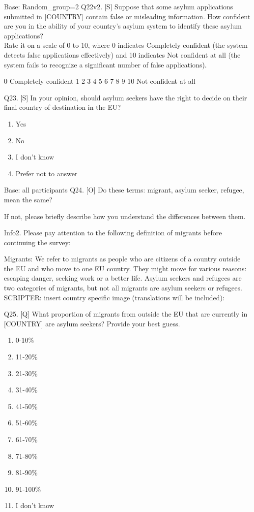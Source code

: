\documentclass[
  12pt,
  a4paper,
]{article}
\providecommand{\tightlist}{%
  \setlength{\itemsep}{0pt}\setlength{\parskip}{0pt}}
\begin{document}
Base: Random\_group=2
Q22v2. {[}S{]} Suppose that some asylum applications submitted in {[}COUNTRY{]} contain false or misleading information. How confident are you in the ability of your country's asylum system to identify these asylum applications?\\
Rate it on a scale of 0 to 10, where 0 indicates Completely confident (the system detects false applications effectively) and 10 indicates Not confident at all (the system fails to recognize a significant number of false applications).

0
Completely confident 1 2 3 4 5 6 7 8 9 10
Not confident at all

Q23. {[}S{]} In your opinion, should asylum seekers have the right to decide on their final country of destination in the EU?

\begin{enumerate}
\def\labelenumi{\arabic{enumi}.}
\tightlist
\item
  Yes
\item
  No
\item
  I don't know
\item
  Prefer not to answer
\end{enumerate}

Base: all participants
Q24. {[}O{]} Do these terms: migrant, asylum seeker, refugee, mean the same?

If not, please briefly describe how you understand the differences between them.

Info2. Please pay attention to the following definition of migrants before continuing the survey:

Migrants: We refer to migrants as people who are citizens of a country outside the EU and who move to one EU country. They might move for various reasons: escaping danger, seeking work or a better life. Asylum seekers and refugees are two categories of migrants, but not all migrants are asylum seekers or refugees.
SCRIPTER: insert country specific image (translations will be included):

Q25. {[}Q{]} What proportion of migrants from outside the EU that are currently in {[}COUNTRY{]} are asylum seekers?
Provide your best guess.

\begin{enumerate}
\def\labelenumi{\arabic{enumi}.}
\tightlist
\item
  0-10\%
\item
  11-20\%
\item
  21-30\%
\item
  31-40\%
\item
  41-50\%
\item
  51-60\%
\item
  61-70\%
\item
  71-80\%
\item
  81-90\%
\item
  91-100\%
\item
  I don't know
\end{enumerate}
\end{document}
